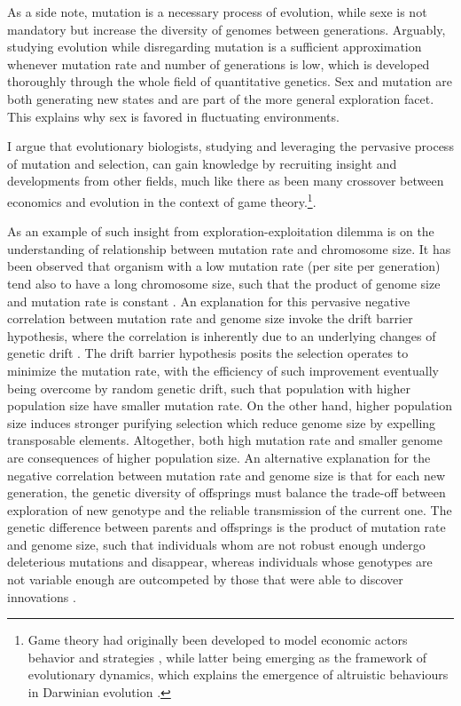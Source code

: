 As a side note, mutation is a necessary process of evolution, while sexe is not mandatory but increase the diversity of genomes between generations.
Arguably, studying evolution while disregarding mutation is a sufficient approximation whenever mutation rate and number of generations is low, which is developed thoroughly through the whole field of quantitative genetics.
Sex and mutation are both generating new states and are part of the more general exploration facet.
This explains why sex is favored in fluctuating environments.

I argue that evolutionary biologists, studying and leveraging the pervasive process of mutation and selection, can gain knowledge by recruiting insight and developments from other fields, much like there as been many crossover between economics and evolution in the context of game theory.\footnote{Game theory had originally been developed to model economic actors behavior and strategies \citep{VonNeumann1947}, while latter being emerging as the framework of evolutionary dynamics, which explains the emergence of altruistic behaviours in Darwinian evolution \citep{Smith1973, Smith1982, Nowak2006}.}.

As an example of such insight from exploration-exploitation dilemma is on the understanding of relationship between mutation rate and chromosome size.
It has been observed that organism with a low mutation rate (per site per generation) tend also to have a long chromosome size, such that the product of genome size and mutation rate is constant \cite{Drake1991}.
An explanation for this pervasive negative correlation between mutation rate and genome size invoke the drift barrier hypothesis, where the correlation is inherently due to an underlying changes of genetic drift \citep{Lynch2016a}.
The drift barrier hypothesis posits the selection operates to minimize the mutation rate, with the efficiency of such improvement eventually being overcome by random genetic drift, such that population with higher population size have smaller mutation rate. 
On the other hand, higher population size induces stronger purifying selection which reduce genome size by expelling transposable elements.
Altogether, both high mutation rate and smaller genome are consequences of higher population size.
An alternative explanation for the negative correlation between mutation rate and genome size is that for each new generation, the genetic diversity of offsprings must balance the trade-off between exploration of new genotype and the reliable transmission of the current one.
The genetic difference between parents and offsprings is the product of mutation rate and genome size, such that individuals whom are not robust enough undergo deleterious mutations and disappear, whereas individuals whose genotypes are not variable enough are outcompeted by those that were able to discover innovations \citep{Knibbe2007, Beslon2010, Hindre2012, Batut2014, Biller2016}.


